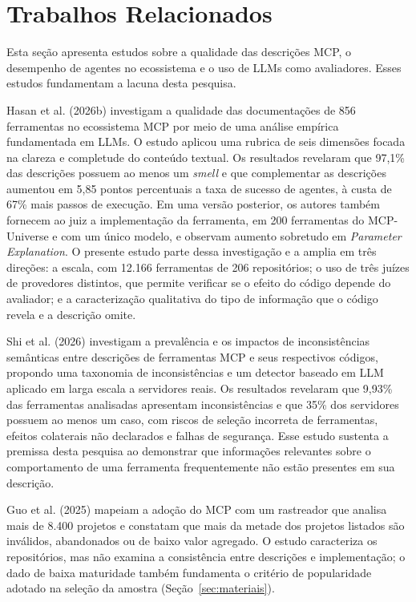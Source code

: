 \section{Trabalhos Relacionados}
\label{sec:trabalhos_relacionados}

Esta seção apresenta estudos sobre a qualidade das descrições MCP, o desempenho de agentes no ecossistema e o uso de LLMs como avaliadores. Esses estudos fundamentam a lacuna desta pesquisa.

Hasan et al. (2026b) \nocite{2026arXiv260214878M} investigam a qualidade das documentações de 856 ferramentas no ecossistema MCP por meio de uma análise empírica fundamentada em LLMs. O estudo aplicou uma rubrica de seis dimensões focada na clareza e completude do conteúdo textual. Os resultados revelaram que 97,1\% das descrições possuem ao menos um \textit{smell} e que complementar as descrições aumentou em 5,85 pontos percentuais a taxa de sucesso de agentes, à custa de 67\% mais passos de execução. Em uma versão posterior, os autores também fornecem ao juiz a implementação da ferramenta, em 200 ferramentas do MCP-Universe e com um único modelo, e observam aumento sobretudo em \textit{Parameter Explanation}. O presente estudo parte dessa investigação e a amplia em três direções: a escala, com 12.166 ferramentas de 206 repositórios; o uso de três juízes de provedores distintos, que permite verificar se o efeito do código depende do avaliador; e a caracterização qualitativa do tipo de informação que o código revela e a descrição omite.

Shi et al. (2026) \nocite{shi2026description} investigam a prevalência e os impactos de inconsistências semânticas entre descrições de ferramentas MCP e seus respectivos códigos, propondo uma taxonomia de inconsistências e um detector baseado em LLM aplicado em larga escala a servidores reais. Os resultados revelaram que 9,93\% das ferramentas analisadas apresentam inconsistências e que 35\% dos servidores possuem ao menos um caso, com riscos de seleção incorreta de ferramentas, efeitos colaterais não declarados e falhas de segurança. Esse estudo sustenta a premissa desta pesquisa ao demonstrar que informações relevantes sobre o comportamento de uma ferramenta frequentemente não estão presentes em sua descrição.

Guo et al. (2025)\nocite{guo2025measurement} mapeiam a adoção do MCP com um rastreador que analisa mais de 8.400 projetos e constatam que mais da metade dos projetos listados são inválidos, abandonados ou de baixo valor agregado. O estudo caracteriza os repositórios, mas não examina a consistência entre descrições e implementação; o dado de baixa maturidade também fundamenta o critério de popularidade adotado na seleção da amostra (Seção~\ref{sec:materiais}).

